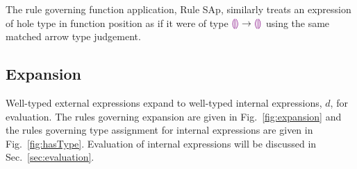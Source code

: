 The rule governing function application, Rule {SAp}, similarly treats an expression of hole type in function position as if it were of type $\textcolor{violet}{\llparenthesis}\textcolor{violet}{\rrparenthesis} \rightarrow \textcolor{violet}{\llparenthesis}\textcolor{violet}{\rrparenthesis}$ using the same matched arrow type judgement.

\vspace{-4px}
\subsection{Expansion}
\label{sec:expansion}
\vspace{-1px}




Well-typed external expressions expand to well-typed internal expressions, $d$, for evaluation. 
The rules governing expansion are given in Fig.~\ref{fig:expansion} and the rules governing type assignment for internal expressions are given in Fig.~\ref{fig:hasType}. 
Evaluation of internal expressions will be discussed in Sec.~\ref{sec:evaluation}.

